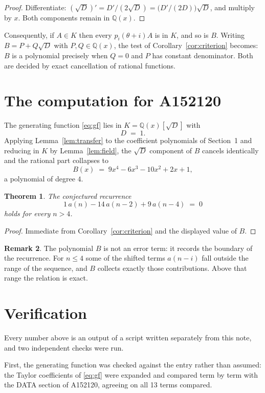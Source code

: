 \documentclass[11pt,a4paper]{article}
\theoremstyle{plain}
\newtheorem{theorem}{Theorem}
\theoremstyle{definition}
\newtheorem{remark}[theorem]{Remark}
\begin{document}
\begin{proof}
Differentiate: $(\sqrt{D})'=D'/(2\sqrt{D})=\bigl(D'/(2D)\bigr)\sqrt{D}$, and multiply by
$x$. Both components remain in $\mathbb{Q}(x)$.
\end{proof}

Consequently, if $A\in K$ then every $p_{i}(\theta+i)A$ is in $K$, and so is $B$. Writing
$B=P+Q\sqrt{D}$ with $P,Q\in\mathbb{Q}(x)$, the test of Corollary~\ref{cor:criterion}
becomes: $B$ is a polynomial precisely when $Q=0$ and $P$ has constant denominator. Both
are decided by exact cancellation of rational functions.

\section{The computation for A152120}

The generating function \eqref{eq:gf} lies in $K=\mathbb{Q}(x)[\sqrt{D}]$ with
\[
D \;=\; 1 .
\]
Applying Lemma~\ref{lem:transfer} to the coefficient polynomials of Section~1 and reducing
in $K$ by Lemma~\ref{lem:field}, the $\sqrt{D}$ component of $B$ cancels identically and
the rational part collapses to
\[
B(x)\;=\;9 x^{4} - 6 x^{3} - 10 x^{2} + 2 x + 1 ,
\]
a polynomial of degree $4$.

\begin{theorem}
The conjectured recurrence
\[
1\,a(n) - 14\,a(n-2) + 9\,a(n-4) \;=\;0
\]
holds for every $n>4$.
\end{theorem}

\begin{proof}
Immediate from Corollary~\ref{cor:criterion} and the displayed value of $B$.
\end{proof}

\begin{remark}
The polynomial $B$ is not an error term: it records the boundary of the recurrence. For
$n\le4$ some of the shifted terms $a(n-i)$ fall outside the range of the sequence,
and $B$ collects exactly those contributions. Above that range the relation is exact.
\end{remark}

\section{Verification}

Every number above is an output of a script written separately from this note, and two
independent checks were run.

First, the generating function was checked against the entry rather than assumed: the
Taylor coefficients of \eqref{eq:gf} were expanded and compared term by term with the DATA
section of A152120, agreeing on all 13 terms compared.
\end{document}
